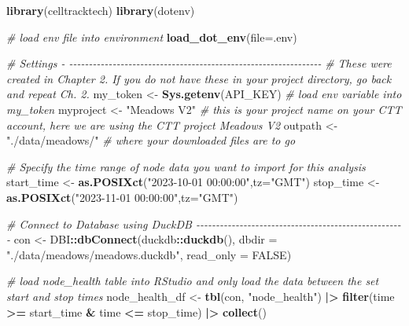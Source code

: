 \documentclass[
]{book}
\newenvironment{Shaded}{\begin{snugshade}}{\end{snugshade}}
\newcommand{\AttributeTok}[1]{\textcolor[rgb]{0.13,0.29,0.53}{#1}}
\newcommand{\CommentTok}[1]{\textcolor[rgb]{0.56,0.35,0.01}{\textit{#1}}}
\newcommand{\ConstantTok}[1]{\textcolor[rgb]{0.56,0.35,0.01}{#1}}
\newcommand{\FunctionTok}[1]{\textcolor[rgb]{0.13,0.29,0.53}{\textbf{#1}}}
\newcommand{\NormalTok}[1]{#1}
\newcommand{\OtherTok}[1]{\textcolor[rgb]{0.56,0.35,0.01}{#1}}
\newcommand{\SpecialCharTok}[1]{\textcolor[rgb]{0.81,0.36,0.00}{\textbf{#1}}}
\newcommand{\StringTok}[1]{\textcolor[rgb]{0.31,0.60,0.02}{#1}}
\begin{document}
\begin{Shaded}
\begin{Highlighting}[]
\FunctionTok{library}\NormalTok{(celltracktech)}
\FunctionTok{library}\NormalTok{(dotenv)}

\CommentTok{\# load env file into environment}
\FunctionTok{load\_dot\_env}\NormalTok{(}\AttributeTok{file=}\StringTok{\textquotesingle{}.env\textquotesingle{}}\NormalTok{)}

\CommentTok{\# Settings {-} {-}{-}{-}{-}{-}{-}{-}{-}{-}{-}{-}{-}{-}{-}{-}{-}{-}{-}{-}{-}{-}{-}{-}{-}{-}{-}{-}{-}{-}{-}{-}{-}{-}{-}{-}{-}{-}{-}{-}{-}{-}{-}{-}{-}{-}{-}{-}{-}{-}{-}{-}{-}{-}{-}{-}{-}{-}{-}{-}{-}{-}{-}{-}{-}}
\CommentTok{\# These were created in Chapter 2. If you do not have these in your project directory, go back and repeat Ch. 2.}
\NormalTok{my\_token }\OtherTok{\textless{}{-}} \FunctionTok{Sys.getenv}\NormalTok{(}\StringTok{\textquotesingle{}API\_KEY\textquotesingle{}}\NormalTok{) }\CommentTok{\# load env variable into my\_token}
\NormalTok{myproject }\OtherTok{\textless{}{-}} \StringTok{"Meadows V2"} \CommentTok{\# this is your project name on your CTT account, here we are using the CTT project \textquotesingle{}Meadows V2\textquotesingle{}}
\NormalTok{outpath }\OtherTok{\textless{}{-}} \StringTok{"./data/meadows/"} \CommentTok{\# where your downloaded files are to go}

\CommentTok{\# Specify the time range of node data you want to import for this analysis}
\NormalTok{start\_time }\OtherTok{\textless{}{-}} \FunctionTok{as.POSIXct}\NormalTok{(}\StringTok{"2023{-}10{-}01 00:00:00"}\NormalTok{,}\AttributeTok{tz=}\StringTok{"GMT"}\NormalTok{)}
\NormalTok{stop\_time }\OtherTok{\textless{}{-}} \FunctionTok{as.POSIXct}\NormalTok{(}\StringTok{"2023{-}11{-}01 00:00:00"}\NormalTok{,}\AttributeTok{tz=}\StringTok{"GMT"}\NormalTok{)}

\CommentTok{\# Connect to Database using DuckDB {-}{-}{-}{-}{-}{-}{-}{-}{-}{-}{-}{-}{-}{-}{-}{-}{-}{-}{-}{-}{-}{-}{-}{-}{-}{-}{-}{-}{-}{-}{-}{-}{-}{-}{-}{-}{-}{-}{-}{-}{-}{-}{-}{-}{-}{-}{-}{-}{-}{-}{-}{-}{-}}
\NormalTok{con }\OtherTok{\textless{}{-}}\NormalTok{ DBI}\SpecialCharTok{::}\FunctionTok{dbConnect}\NormalTok{(duckdb}\SpecialCharTok{::}\FunctionTok{duckdb}\NormalTok{(), }
                      \AttributeTok{dbdir =} \StringTok{"./data/meadows/meadows.duckdb"}\NormalTok{, }
                      \AttributeTok{read\_only =} \ConstantTok{FALSE}\NormalTok{)}

\CommentTok{\# load node\_health table into RStudio and only load the data between the set start and stop times}
\NormalTok{node\_health\_df }\OtherTok{\textless{}{-}} \FunctionTok{tbl}\NormalTok{(con, }\StringTok{"node\_health"}\NormalTok{) }\SpecialCharTok{|\textgreater{}} 
  \FunctionTok{filter}\NormalTok{(time }\SpecialCharTok{\textgreater{}=}\NormalTok{ start\_time }\SpecialCharTok{\&}\NormalTok{ time }\SpecialCharTok{\textless{}=}\NormalTok{ stop\_time) }\SpecialCharTok{|\textgreater{}}
  \FunctionTok{collect}\NormalTok{()}


\end{Highlighting}
\end{Shaded}
\end{document}

